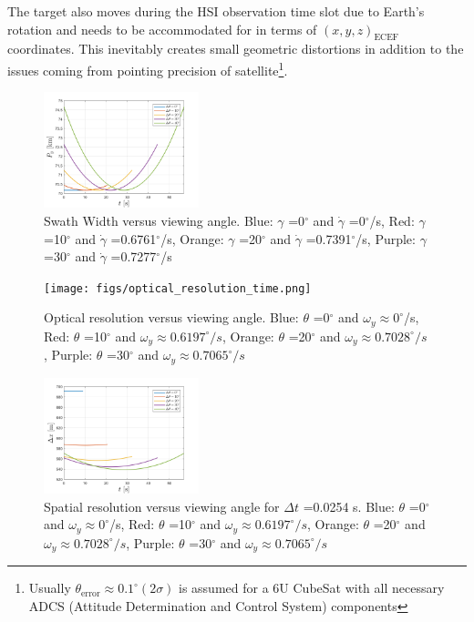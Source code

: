 The target also moves during the HSI observation time slot due to Earth's rotation and needs to be accommodated for in terms of $(x,y,z)_{\text{ECEF}}$ coordinates. This inevitably creates small geometric distortions in addition to the issues coming from pointing precision of satellite\footnote{Usually $\theta_{\text{error}}\approx 0.1 ^{\circ} (2\sigma)$ is assumed for a 6U CubeSat with all necessary ADCS (Attitude Determination and Control System) components}. %
\begin{figure}[htbp]
  \centering
      \includegraphics[width=0.4\textwidth]{figs/swath_time.png}
  \caption{Swath Width versus viewing angle. Blue: $\gamma$ =0$^{\circ}$ and $\dot{\gamma}$ =0$^{\circ}$/s, Red: $\gamma$ =10$^{\circ}$ and $\dot{\gamma}$ =0.6761$^{\circ}$/s, Orange: $\gamma$ =20$^{\circ}$ and $\dot{\gamma}$ =0.7391$^{\circ}$/s, Purple: $\gamma$ =30$^{\circ}$ and $\dot{\gamma}$ =0.7277$^{\circ}$/s}
	\label{fig:spatial_time}
\end{figure}
\begin{figure}[htbp]
  \centering
      \texttt{[image: figs/optical\_resolution\_time.png]}
  \caption{Optical resolution versus viewing angle. Blue: $\theta$ =0$^{\circ}$ and $\omega_{y}\approx 0^{\circ}$/s, Red: $\theta$ =10$^{\circ}$ and $\omega_{y}\approx 0.6197^{\circ}/s$, Orange: $\theta$ =20$^{\circ}$ and $\omega_{y}\approx 0.7028^{\circ}/s$, Purple: $\theta$ =30$^{\circ}$ and $\omega_{y}\approx 0.7065^{\circ}/s$}
	\label{fig:spatial_time}
\end{figure}
\begin{figure}[htbp]
  \centering
      \includegraphics[width=0.4\textwidth]{figs/spatial_time.png}
  \caption{Spatial resolution versus viewing angle for $\Delta t$ =0.0254 s. Blue: $\theta$ =0$^{\circ}$ and $\omega_{y}\approx 0^{\circ}$/s, Red: $\theta$ =10$^{\circ}$ and $\omega_{y}\approx 0.6197^{\circ}/s$, Orange: $\theta$ =20$^{\circ}$ and $\omega_{y}\approx 0.7028^{\circ}/s$, Purple: $\theta$ =30$^{\circ}$ and $\omega_{y}\approx 0.7065^{\circ}/s$}
	\label{fig:spatial_time}
\end{figure}
